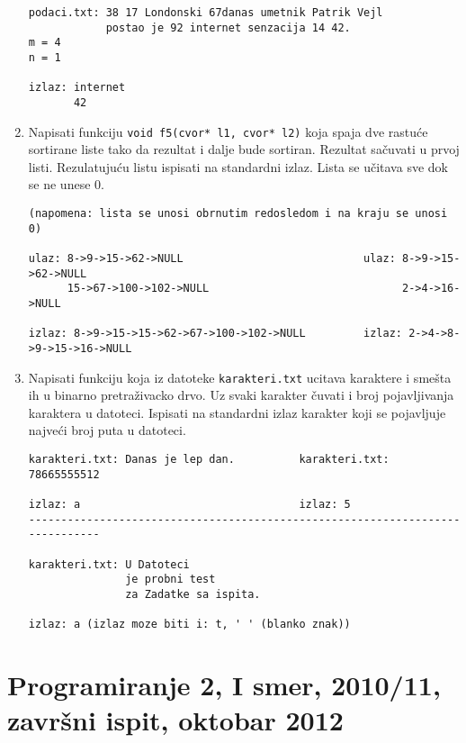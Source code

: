 \begin{enumerate}
\begin{small}
\begin{verbatim}
podaci.txt: 38 17 Londonski 67danas umetnik Patrik Vejl
            postao je 92 internet senzacija 14 42.
m = 4
n = 1

izlaz: internet
       42
\end{verbatim}
\end{small}


\item Napisati funkciju \verb|void f5(cvor* l1, cvor* l2)| koja spaja dve rastu\'ce sortirane liste tako
da rezultat i dalje bude sortiran. Rezultat sa\v cuvati u prvoj listi. Rezulatuju\' cu
listu ispisati na standardni izlaz. Lista se u\v citava sve dok se ne unese 0.

\begin{small}
\begin{verbatim}
(napomena: lista se unosi obrnutim redosledom i na kraju se unosi 0)

ulaz: 8->9->15->62->NULL                            ulaz: 8->9->15->62->NULL
      15->67->100->102->NULL                              2->4->16->NULL

izlaz: 8->9->15->15->62->67->100->102->NULL         izlaz: 2->4->8->9->15->16->NULL
\end{verbatim}
\end{small}


\item Napisati funkciju koja iz datoteke \verb|karakteri.txt|
ucitava karaktere i sme\v sta ih u binarno pretra\v zivacko drvo.
Uz svaki karakter \v cuvati i broj pojavljivanja karaktera u datoteci.
Ispisati na standardni izlaz karakter koji se pojavljuje najve\'ci broj puta u datoteci.


\begin{small}
\begin{verbatim}
karakteri.txt: Danas je lep dan.          karakteri.txt: 78665555512

izlaz: a                                  izlaz: 5
------------------------------------------------------------------------------

karakteri.txt: U Datoteci
               je probni test
               za Zadatke sa ispita.

izlaz: a (izlaz moze biti i: t, ' ' (blanko znak))
\end{verbatim}
\end{small}
\end{enumerate}


\section*{Programiranje 2, I smer, 2010/11, zavr\v{s}ni ispit, oktobar 2012}



